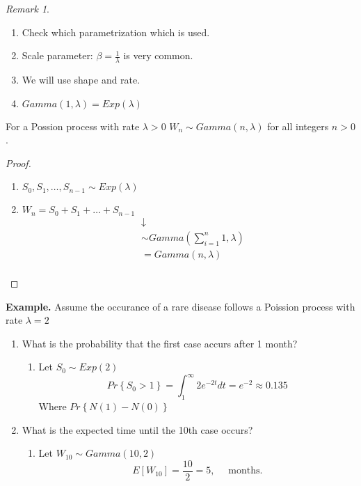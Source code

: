 \documentclass{article}
\theoremstyle{remark}
\newtheorem*{remark}{Remark}
\begin{document}
\begin{remark}
  \begin{enumerate}[label=(\roman*)]
    \item Check which parametrization which is used.
    \item Scale parameter: $\beta  = \frac{1}{\lambda }$ is very common.
    \item We will use shape and rate. 
    \item $Gamma\left( 1, \lambda  \right) = Exp \left( \lambda  \right)$
  \end{enumerate}
\end{remark}
\begin{theorem}
  For a Possion process with rate $\lambda  > 0$ $W_{n} \sim Gamma\left( n, \lambda  \right)$ for all integers  $n > 0$.
\end{theorem}

\begin{proof}
  \begin{enumerate}[label=(\roman*)]
    \item $\displaystyle S_{0}, S_{1}, \ldots, S_{n-1} \sim Exp\left( \lambda  \right)$
    \item $\displaystyle W_{n} = S_{0} + S_{1} + \ldots + S_{n-1}  $ \[
        \begin{split}
      &  \downarrow  \\
       &  \sim Gamma\left( \sum_{i=1}^{n} 1 , \lambda  \right) \\
       &= Gamma\left( n, \lambda  \right) \\
        \end{split} 
    \] 
  \end{enumerate}
\end{proof}

\begin{tcolorbox}
  \textbf{Example.} Assume the occurance of a rare disease follows a Poission process with rate $ \lambda  = 2$ 
  \begin{enumerate}[label=(\alph*)]
    \item What is the probability that the first case accurs after 1 month?
      \begin{enumerate}[label=(\roman*)]
        \item Let $S_{0}  \sim Exp \left( 2 \right)$ \[
        Pr \left \{ S _{0} > 1 \right \}  = \int_{1}^{\infty}  2 e^{ -2t} dt = e^{-2} \approx 0.135 
        \] 
        Where  $\displaystyle  Pr \left \{ N\left( 1 \right) - N\left( 0 \right) \right \} $
      \end{enumerate}
    \item What is the expected time until the 10th case occurs?
      \begin{enumerate}[label=(\roman*)]
        \item Let $ W_{10} \sim Gamma\left( 10,2 \right)$ \[
        E\left[ W_{10} \right] = \frac{10}{2} = 5, \quad  \text{ months.} 
        \] 
      \end{enumerate}
  \end{enumerate}
\end{tcolorbox}
\end{document}
